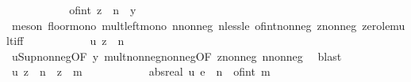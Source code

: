 \begin{isabellebody}
\ \ \ \ \ \ \isamarkupfalse%
\ \isamarkupfalse%
\ {\isachardoublequoteopen}{\isachardot}{\kern0pt}{\isachardot}{\kern0pt}{\isachardot}{\kern0pt}\ {\isasymle}\ {\isasymlfloor}of{\isacharunderscore}{\kern0pt}int\ {\isacharparenleft}{\kern0pt}z\ {\isacharasterisk}{\kern0pt}\ n{\isacharparenright}{\kern0pt}\ {\isacharasterisk}{\kern0pt}\ y{\isasymrfloor}{\isachardoublequoteclose}\ \isamarkupfalse%
\ {\isacharasterisk}{\kern0pt}{\isacharparenleft}{\kern0pt}{}{\isacharparenright}{\kern0pt}\ \isamarkupfalse%
\ {\isacharparenleft}{\kern0pt}meson\ floor{\isacharunderscore}{\kern0pt}mono\ mult{\isacharunderscore}{\kern0pt}left{\isacharunderscore}{\kern0pt}mono\ n{\isacharunderscore}{\kern0pt}nonneg\ nless{\isacharunderscore}{\kern0pt}le\ of{\isacharunderscore}{\kern0pt}int{\isacharunderscore}{\kern0pt}nonneg\ z{\isacharunderscore}{\kern0pt}nonneg\ zero{\isacharunderscore}{\kern0pt}le{\isacharunderscore}{\kern0pt}mult{\isacharunderscore}{\kern0pt}iff{\isacharparenright}{\kern0pt}\isanewline
\ \ \ \ \ \ \isamarkupfalse%
\ \isamarkupfalse%
\ {\isachardoublequoteopen}{\isachardot}{\kern0pt}{\isachardot}{\kern0pt}{\isachardot}{\kern0pt}\ {\isasymle}\ u\ {\isacharparenleft}{\kern0pt}z\ {\isacharasterisk}{\kern0pt}\ n{\isacharparenright}{\kern0pt}{\isachardoublequoteclose}\ \isamarkupfalse%
\ u{\isacharunderscore}{\kern0pt}Sup{\isacharunderscore}{\kern0pt}nonneg{\isacharbrackleft}{\kern0pt}OF\ y{\isacharparenleft}{\kern0pt}{}{\isacharparenright}{\kern0pt}{\isacharbrackright}{\kern0pt}\ mult{\isacharunderscore}{\kern0pt}nonneg{\isacharunderscore}{\kern0pt}nonneg{\isacharbrackleft}{\kern0pt}OF\ z{\isacharunderscore}{\kern0pt}nonneg\ n{\isacharunderscore}{\kern0pt}nonneg{\isacharbrackright}{\kern0pt}\ \isamarkupfalse%
\ blast\isanewline
\ \ \ \ \ \ \isamarkupfalse%
\ \isamarkupfalse%
\ {\isachardoublequoteopen}u\ {\isacharparenleft}{\kern0pt}z\ {\isacharasterisk}{\kern0pt}\ n{\isacharparenright}{\kern0pt}\ {\isasymge}\ z\ {\isacharasterisk}{\kern0pt}\ m{\isachardoublequoteclose}\ \isacommand{{\isachardot}{\kern0pt}}\isamarkupfalse%
\isanewline
\ \ \ \ \isacommand{{\isacharbraceright}{\kern0pt}}\isamarkupfalse%
\isanewline
\ \ \ \ \isamarkupfalse%
\ {\isachardoublequoteopen}abs{\isacharunderscore}{\kern0pt}real\ {\isacharparenleft}{\kern0pt}u\ {\isacharasterisk}{\kern0pt}\isactrlsub e\ {\isacharparenleft}{\kern0pt}{\isacharasterisk}{\kern0pt}{\isacharparenright}{\kern0pt}\ n{\isacharparenright}{\kern0pt}\ {\isasymge}\ of{\isacharunderscore}{\kern0pt}int\ m{\isachardoublequoteclose}\ \isamarkupfalse%

\end{isabellebody}
